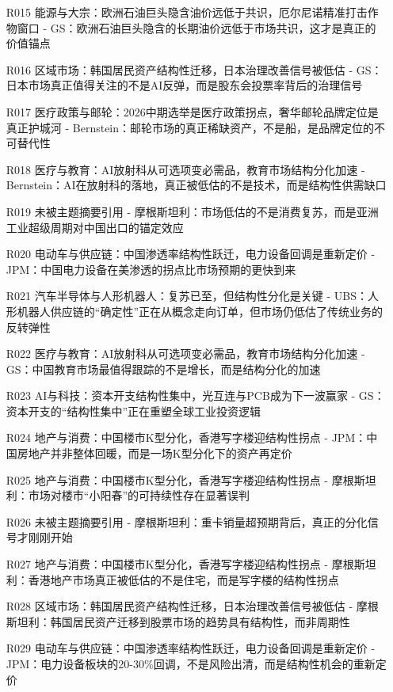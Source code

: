 \documentclass[11pt]{ctexart}
\begin{document}
\begin{itemize}
  \item [R015] 能源与大宗：欧洲石油巨头隐含油价远低于共识，厄尔尼诺精准打击作物窗口 - GS：欧洲石油巨头隐含的长期油价远低于市场共识，这才是真正的价值锚点
  \item [R016] 区域市场：韩国居民资产结构性迁移，日本治理改善信号被低估 - GS：日本市场真正值得关注的不是AI反弹，而是股东会投票率背后的治理信号
  \item [R017] 医疗政策与邮轮：2026中期选举是医疗政策拐点，奢华邮轮品牌定位是真正护城河 - Bernstein：邮轮市场的真正稀缺资产，不是船，是品牌定位的不可替代性
  \item [R018] 医疗与教育：AI放射科从可选项变必需品，教育市场结构分化加速 - Bernstein：AI在放射科的落地，真正被低估的不是技术，而是结构性供需缺口
  \item [R019] 未被主题摘要引用 - 摩根斯坦利：市场低估的不是消费复苏，而是亚洲工业超级周期对中国出口的锚定效应
  \item [R020] 电动车与供应链：中国渗透率结构性跃迁，电力设备回调是重新定价 - JPM：中国电力设备在美渗透的拐点比市场预期的更快到来
  \item [R021] 汽车半导体与人形机器人：复苏已至，但结构性分化是关键 - UBS：人形机器人供应链的“确定性”正在从概念走向订单，但市场仍低估了传统业务的反转弹性
  \item [R022] 医疗与教育：AI放射科从可选项变必需品，教育市场结构分化加速 - GS：中国教育市场最值得跟踪的不是增长，而是结构分化的加速
  \item [R023] AI与科技：资本开支结构性集中，光互连与PCB成为下一波赢家 - GS：资本开支的“结构性集中”正在重塑全球工业投资逻辑
  \item [R024] 地产与消费：中国楼市K型分化，香港写字楼迎结构性拐点 - JPM：中国房地产并非整体回暖，而是一场K型分化下的资产再定价
  \item [R025] 地产与消费：中国楼市K型分化，香港写字楼迎结构性拐点 - 摩根斯坦利：市场对楼市“小阳春”的可持续性存在显著误判
  \item [R026] 未被主题摘要引用 - 摩根斯坦利：重卡销量超预期背后，真正的分化信号才刚刚开始
  \item [R027] 地产与消费：中国楼市K型分化，香港写字楼迎结构性拐点 - 摩根斯坦利：香港地产市场真正被低估的不是住宅，而是写字楼的结构性拐点
  \item [R028] 区域市场：韩国居民资产结构性迁移，日本治理改善信号被低估 - 摩根斯坦利：韩国居民资产迁移到股票市场的趋势具有结构性，而非周期性
  \item [R029] 电动车与供应链：中国渗透率结构性跃迁，电力设备回调是重新定价 - JPM：电力设备板块的20-30\%回调，不是风险出清，而是结构性机会的重新定价

\end{itemize}
\end{document}
